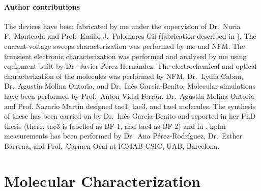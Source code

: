 	\paragraph{Author contributions}
	The devices have been fabricated by me under the supervision of Dr.\ Nuria F.\ Montcada and Prof.\ Emilio J.\ Palomares Gil (fabrication described in ).
	The current\hyp{}voltage sweeps characterization was performed by me and NFM.
	The transient electronic characterization was performed and analysed by me using equipment built by Dr.\ Javier Pérez Hernández.
	The electrochemical and optical characterization of the molecules was performed by NFM, Dr.\ Lydia Cabau, Dr.\ Agustín Molina Ontoria, and Dr.\ Inés García\hyp{}Benito.
	Molecular simulations have been performed by Prof.\ Anton Vidal\hyp{}Ferran.
	Dr.\ Agustín Molina Ontoria and Prof. Nazario Martín designed \gls{tae1}, \gls{tae3}, and \gls{tae4} molecules.
	The synthesis of these has been carried on by Dr.\ Inés García\hyp{}Benito and reported in her PhD thesis \cite{Garcia-Benito2017} (there, \gls{tae3} is labelled as BF-1, and \gls{tae4} as BF-2) and in \cite{Gelmetti2019}.
	\Gls{kpfm} measurements has been performed by Dr.\ Ana Pérez-Rodríguez, Dr.\ Esther Barrena, and Prof.\ Carmen Ocal at ICMAB-CSIC, UAB, Barcelona.



\section{Molecular Characterization}

